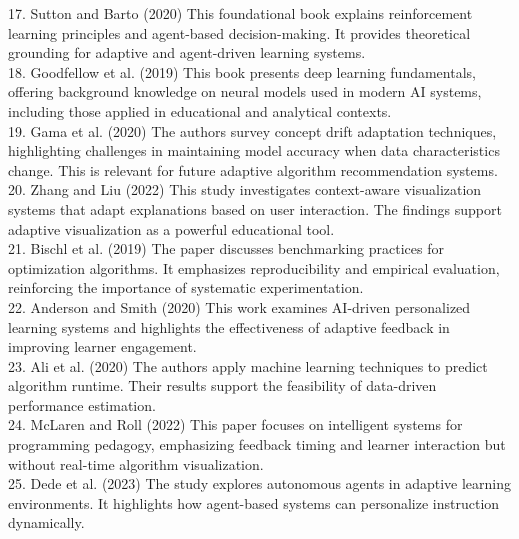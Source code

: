 \documentclass[12pt,a4paper,oneside,openany]{report}
\begin{document}
17. Sutton and Barto (2020) \cite{Sutton2020}
This foundational book explains reinforcement learning principles and agent-based decision-making. It provides theoretical grounding for adaptive and agent-driven learning systems.\\

18. Goodfellow et al. (2019) \cite{Goodfellow2019}
This book presents deep learning fundamentals, offering background knowledge on neural models used in modern AI systems, including those applied in educational and analytical contexts.\\

19. Gama et al. (2020) \cite{Gama2020}
The authors survey concept drift adaptation techniques, highlighting challenges in maintaining model accuracy when data characteristics change. This is relevant for future adaptive algorithm recommendation systems.\\

20. Zhang and Liu (2022) \cite{Zhang2022}
This study investigates context-aware visualization systems that adapt explanations based on user interaction. The findings support adaptive visualization as a powerful educational tool.\\

21. Bischl et al. (2019) \cite{BischlBenchmark2019}
The paper discusses benchmarking practices for optimization algorithms. It emphasizes reproducibility and empirical evaluation, reinforcing the importance of systematic experimentation.\\

22. Anderson and Smith (2020) \cite{Anderson2020}
This work examines AI-driven personalized learning systems and highlights the effectiveness of adaptive feedback in improving learner engagement.\\

23. Ali et al. (2020) \cite{Ali2020}
The authors apply machine learning techniques to predict algorithm runtime. Their results support the feasibility of data-driven performance estimation.\\

24. McLaren and Roll (2022) \cite{McLaren2022}
This paper focuses on intelligent systems for programming pedagogy, emphasizing feedback timing and learner interaction but without real-time algorithm visualization.\\

25. Dede et al. (2023) \cite{Dede2023}
The study explores autonomous agents in adaptive learning environments. It highlights how agent-based systems can personalize instruction dynamically.\\
\end{document}
